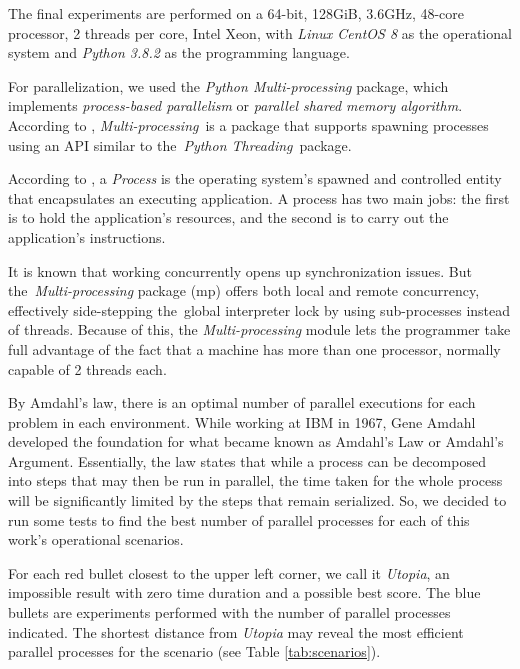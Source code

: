 \documentclass[preprint,authoryear]{elsarticle}
\begin{document}
The final experiments are performed on a 64-bit, 128GiB, 3.6GHz, 48-core processor, 2 threads per core, Intel Xeon, with {\it Linux CentOS 8} as the operational system and {\it Python 3.8.2} as the programming language.

For parallelization, we used the {\it Python Multi-processing} package, which implements {\it process-based parallelism} or {\it parallel shared memory algorithm}. According to \cite{Multi-processing}, {\it Multi-processing} is a package that supports spawning processes using an API similar to the {\it Python Threading} package.

According to \cite[p.271]{Breshears2009}, a {\it Process} is the operating system’s spawned and controlled entity that encapsulates an executing application. A process has two main jobs: the first is to hold the application's resources, and the second is to carry out the application's instructions. 

It is known that working concurrently opens up synchronization issues. But the {\it Multi-processing} package (mp) offers both local and remote concurrency, effectively side-stepping the global interpreter lock by using sub-processes instead of threads. Because of this, the {\it Multi-processing} module lets the programmer take full advantage of the fact that a machine has more than one processor, normally capable of 2 threads each.

By Amdahl's law, there is an optimal number of parallel executions for each problem in each environment. While working at IBM in 1967, Gene Amdahl developed the foundation for what became known as Amdahl's Law or Amdahl's Argument. Essentially, the law states that while a process can be decomposed into steps that may then be run in parallel, the time taken for the whole process will be significantly limited by the steps that remain serialized. So, we decided to run some tests to find the best number of parallel processes for each of this work's operational scenarios.

For each red bullet closest to the upper left corner, we call it {\it Utopia}, an impossible result with zero time duration and a possible best score. The blue bullets are experiments performed with the number of parallel processes indicated. The shortest distance from {\it Utopia} may reveal the most efficient parallel processes for the scenario (see Table \ref{tab:scenarios}). 
\end{document}
